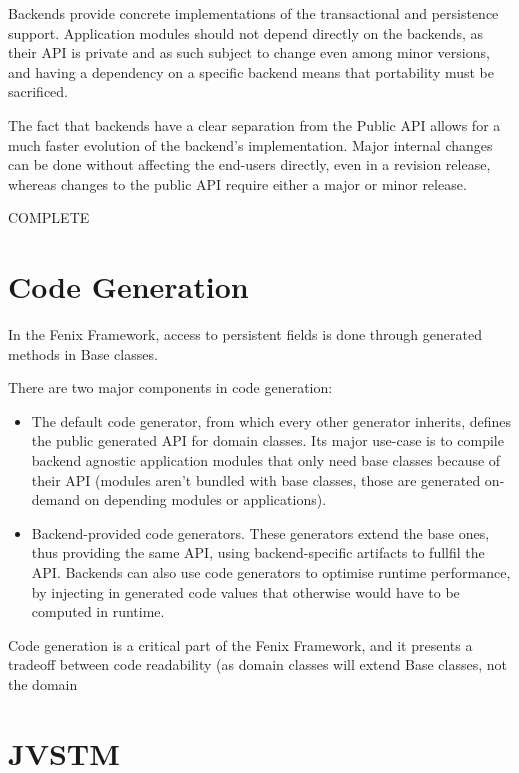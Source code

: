 Backends provide concrete implementations of the transactional and
persistence support. Application modules should not depend directly on
the backends, as their API is private and as such subject to change
even among minor versions, and having a dependency on a specific
backend means that portability must be sacrificed.

The fact that backends have a clear separation from the Public API
allows for a much faster evolution of the backend's
implementation. Major internal changes can be done without affecting
the end-users directly, even in a revision release, whereas changes to
the public API require either a major or minor release. 

COMPLETE

\section{Code Generation}
\label{sec:codeGen}

In the Fenix Framework, access to persistent fields is done through
generated methods in Base classes. 

There are two major components in code generation:

\begin{itemize}

\item The default code generator, from which every other generator
  inherits, defines the public generated API for domain classes. Its
  major use-case is to compile backend agnostic application modules
  that only need base classes because of their API (modules aren't
  bundled with base classes, those are generated on-demand on
  depending modules or applications).

\item Backend-provided code generators. These generators extend the
  base ones, thus providing the same API, using backend-specific
  artifacts to fullfil the API. Backends can also use code generators
  to optimise runtime performance, by injecting in generated code
  values that otherwise would have to be computed in runtime.
\end{itemize}

Code generation is a critical part of the Fenix Framework, and it
presents a tradeoff between code readability (as domain classes will
extend Base classes, not the domain  

\section{JVSTM}
\label{sec:jvstm}

